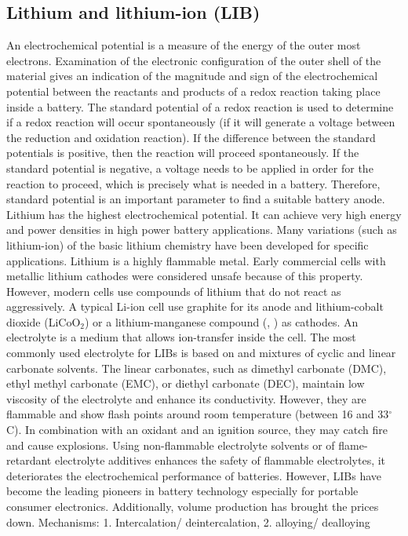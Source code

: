 \subsection{Lithium and lithium-ion (LIB)}
An electrochemical potential is a measure of the energy of the outer most electrons. Examination of the electronic configuration of the outer shell of the material gives an indication of the magnitude and sign of the electrochemical potential between the reactants and products of a redox reaction taking place inside a battery. The standard potential of a redox reaction is used to determine if a redox reaction will occur spontaneously (if it will generate a voltage between the reduction and oxidation reaction). If the difference between the standard potentials is positive, then the reaction will proceed spontaneously. If the standard potential is negative, a voltage needs to be applied in order for the reaction to proceed, which is precisely what is needed in a battery. Therefore, standard potential is an important parameter to find a suitable battery anode. Lithium has the highest electrochemical potential. It can achieve very high energy and power densities in high power battery applications. Many variations (such as lithium-ion) of the basic lithium chemistry have been developed for specific applications. Lithium is a highly flammable metal. Early commercial cells with metallic lithium cathodes were considered unsafe because of this property. However, modern cells use compounds of lithium that do not react as aggressively. A typical Li-ion cell use graphite for its anode and lithium-cobalt dioxide (LiCoO$_2$) or a lithium-manganese compound (, ) as cathodes. An electrolyte is a medium that allows ion-transfer inside the cell. The most commonly used electrolyte for LIBs is based on  and mixtures of cyclic and linear carbonate solvents. The linear carbonates, such as dimethyl carbonate (DMC), ethyl methyl carbonate (EMC), or diethyl carbonate (DEC), maintain low viscosity of the electrolyte and enhance its conductivity. However, they are flammable and show flash points around room temperature (between 16 and 33$^{\circ}$C). In combination with an oxidant and an ignition source, they may catch fire and cause explosions. Using non-flammable electrolyte solvents or of flame-retardant electrolyte additives enhances the safety of flammable electrolytes, it deteriorates the electrochemical performance of batteries. 
However, LIBs have become the leading pioneers in battery technology especially for portable consumer electronics. Additionally, volume production has brought the prices down.
Mechanisms: 1. Intercalation/ deintercalation, 2. alloying/ dealloying 
